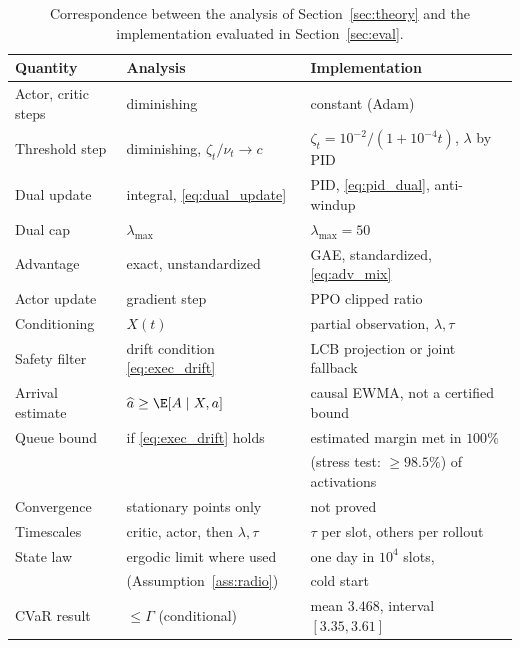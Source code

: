 \begin{table}[t]
  \centering
  \caption{Correspondence between the analysis of Section~\ref{sec:theory} and the implementation evaluated in Section~\ref{sec:eval}.}
  \label{tab:theory_impl}
  \scriptsize
  \setlength{\tabcolsep}{3pt}
  \begin{tabular}{@{}lll@{}}
    \toprule
    Quantity & Analysis & Implementation \\
    \midrule
    Actor, critic steps & diminishing & constant (Adam) \\
    Threshold step & diminishing, $\zeta_t/\nu_t\to c$ & $\zeta_t=10^{-2}/(1{+}10^{-4}t)$, $\lambda$ by PID \\
    Dual update & integral, \eqref{eq:dual_update} & PID, \eqref{eq:pid_dual}, anti-windup \\
    Dual cap & $\lambda_{\max}$ & $\lambda_{\max}\!=\!50$ \\
    Advantage & exact, unstandardized & GAE, standardized, \eqref{eq:adv_mix} \\
    Actor update & gradient step & PPO clipped ratio \\
    Conditioning & $X(t)$ & partial observation, $\lambda,\tau$ \\
    Safety filter & drift condition \eqref{eq:exec_drift} & LCB projection or joint fallback \\
    Arrival estimate & $\widehat a\ge\E[A\mid X,a]$ & causal EWMA, not a certified bound \\
    Queue bound & if \eqref{eq:exec_drift} holds & estimated margin met in $100\%$ \\
     & & (stress test: $\ge98.5\%$) of activations \\
    Convergence & stationary points only & not proved \\
    Timescales & critic, actor, then $\lambda,\tau$ & $\tau$ per slot, others per rollout \\
    State law & ergodic limit where used & one day in $10^4$ slots, \\
     & (Assumption~\ref{ass:radio}) & cold start \\
    CVaR result & $\le\Gamma$ (conditional) & mean $3.468$, interval $[3.35,3.61]$ \\
    \bottomrule
  \end{tabular}
\end{table}
